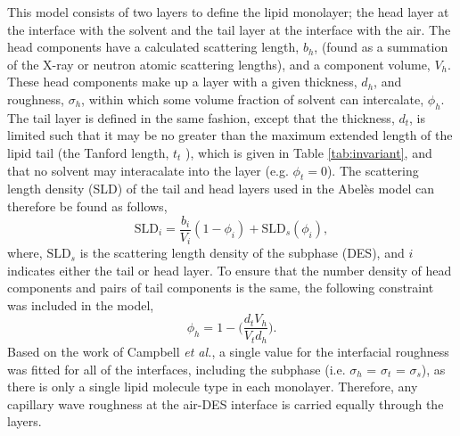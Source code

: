 \documentclass[amsmath,amssymb,twocolumn,superscriptaddress]{revtex4-1}
\begin{document}
This model consists of two layers to define the lipid monolayer; the head layer at the interface with the solvent and the tail layer at the interface with the air.
The head components have a calculated scattering length, $b_h$, (found as a summation of the X-ray or neutron atomic scattering lengths), and a component volume, $V_h$.
These head components make up a layer with a given thickness, $d_h$, and roughness, $\sigma_h$, within which some volume fraction of solvent can intercalate, $\phi_h$.
The tail layer is defined in the same fashion, except that the thickness, $d_t$, is limited such that it may be no greater than the maximum extended length of the lipid tail (the Tanford length, $t_t$ \cite{Tanford1980}), which is given in Table \ref{tab:invariant}, and that no solvent may interacalate into the layer (e.g. $\phi_t = 0$).
The scattering length density (SLD) of the tail and head layers used in the Abel\`{e}s model can therefore be found as follows,
%
\begin{equation}
\text{SLD}_i = \frac{b_i}{V_i}(1 - \phi_i) + \text{SLD}_{s}(\phi_i),
\end{equation}
%
where, $\text{SLD}_{s}$ is the scattering length density of the subphase (DES), and $i$ indicates either the tail or head layer.
To ensure that the number density of head components and pairs of tail components is the same, the following constraint was included in the model,\cite{Braun2017}
%
\begin{equation}
\label{equ:phih}
\phi_h =  1 - \bigg(\frac{d_tV_h}{V_td_h}\bigg).
\end{equation}
%
Based on the work of Campbell \emph{et al.},\cite{Campbell2018} a single value for the interfacial roughness was fitted for all of the interfaces, including the subphase (i.e. $\sigma_h$ = $\sigma_t$ = $\sigma_s$), as there is only a single lipid molecule type in each monolayer. Therefore, any capillary wave roughness at the air-DES interface is carried equally through the layers.
%
\end{document}
